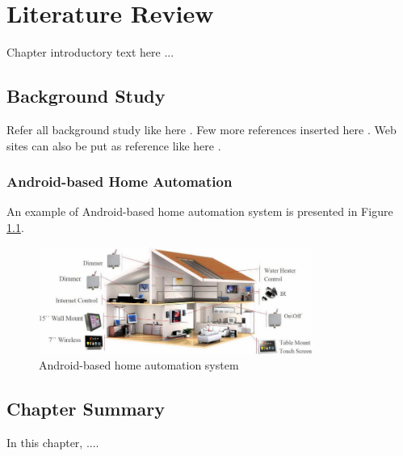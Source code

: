 \chapter{Literature Review}
Chapter introductory text here ...   

\section{Background Study}
Refer all background study like here \cite{elshafee2012design}. Few more references inserted here \cite{harper2006inside} \cite{7887698}. Web sites can  also be put as reference like here \cite{arduino-ide}. 

\subsection{Android-based Home Automation}
An example of Android-based home automation system \cite{Agarwal} is presented in  Figure \ref{fig2}.  
\begin{figure}[htp]
\begin{center}
\includegraphics[width=0.8\textwidth]{fig2}
\end{center}
\caption{Android-based home automation system}
\label{fig2}
\end{figure}


\section{Chapter Summary}
In this chapter,  ....

